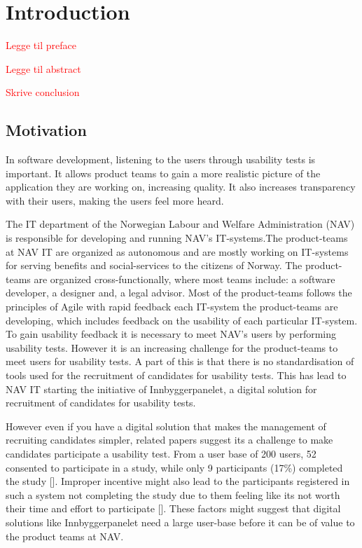 \section{Introduction}

\textcolor{red}{Legge til preface}

\textcolor{red}{Legge til abstract}

\textcolor{red}{Skrive conclusion}

\subsection{Motivation}
In software development, listening to the users through usability tests is important. It allows product teams to gain a more realistic picture of the application they are working on, increasing quality. It also increases transparency with their users, making the users feel more heard. 

The IT department of the Norwegian Labour and Welfare Administration (NAV) is responsible for developing and running NAV's IT-systems.The product-teams at NAV IT are organized as autonomous and are mostly working on IT-systems for serving benefits and social-services to the citizens of Norway. The product-teams are organized cross-functionally, where most teams include: a software developer, a designer and, a legal advisor. Most of the product-teams follows the principles of Agile with rapid feedback each IT-system the product-teams are developing, which includes feedback on the usability of each particular IT-system. To gain usability feedback it is necessary to meet NAV's users by performing usability tests. However it is an increasing challenge for the product-teams to meet users for usability tests. A part of this is that there is no standardisation of tools used for the recruitment of candidates for usability tests. This has lead to NAV IT starting the initiative of Innbyggerpanelet, a digital solution for recruitment of candidates for usability tests.

However even if you have a digital solution that makes the management of recruiting candidates simpler, related papers suggest its a challenge to make candidates participate a usability test. From a user base of 200 users, 52 consented to participate in a study, while only 9 participants (17\%) completed the study [\cite{pkf_2018}]. Improper incentive might also lead to the participants registered in such a system not completing the study due to them feeling like its not worth their time and effort to participate [\cite{pkf_2018}]. These factors might suggest that digital solutions like Innbyggerpanelet need a large user-base before it can be of value to the product teams at NAV.

